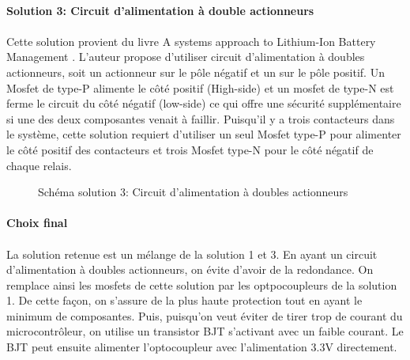 		\paragraph*{Solution 3: Circuit d'alimentation à double actionneurs}
		\paragraph*{}
		Cette solution provient du livre A systems approach to Lithium-Ion Battery Management \cite{System_Approach}. L'auteur propose d'utiliser circuit d'alimentation à doubles actionneurs, soit un actionneur sur le pôle négatif et un sur le pôle positif. Un Mosfet de type-P alimente le côté positif (High-side) et un mosfet de type-N est ferme le circuit du côté négatif (low-side) ce qui offre une sécurité supplémentaire si une des deux composantes venait à faillir. Puisqu'il y a trois contacteurs dans le système, cette solution requiert d'utiliser un seul Mosfet type-P pour alimenter le côté positif des contacteurs et trois Mosfet type-N pour le côté négatif de chaque relais.

		\begin{figure}[H]
			\centering
			\caption{Schéma solution 3: Circuit d'alimentation à doubles actionneurs}
			\label{fig:contactorsol3}
		\end{figure}
		
		\paragraph*{Choix final}
		\paragraph*{}
		La solution retenue est un mélange de la solution 1 et 3. En ayant un circuit d'alimentation à doubles actionneurs, on évite d'avoir de la redondance. On remplace ainsi les mosfets de cette solution par les optpocoupleurs de la solution 1. De cette façon, on s'assure de la plus haute protection tout en ayant le minimum de composantes. Puis, puisqu'on veut éviter de tirer trop de courant du microcontrôleur, on utilise un transistor BJT s'activant avec un faible courant. Le BJT peut ensuite alimenter l'optocoupleur avec l'alimentation 3.3V directement.

